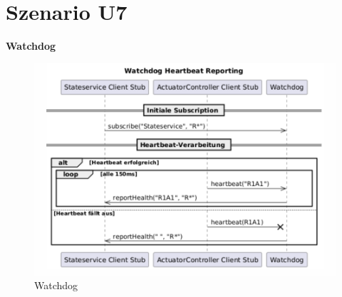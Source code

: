 \section{Szenario U7}
\textbf{Watchdog}\\
\begin{figure}[h!]
	\centering
	\includegraphics[width=0.8\linewidth]{diagrams/watchdog_16_07.png}
	\caption{Watchdog}
	\label{fig:Watchdog}
\end{figure}


















